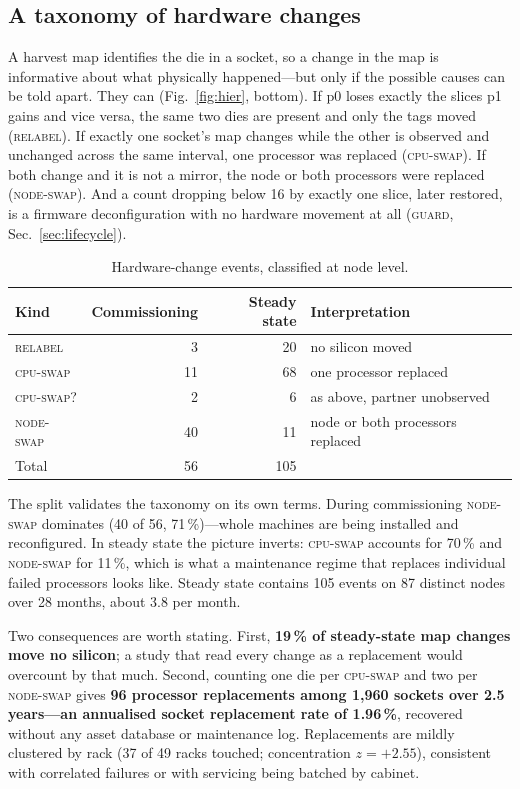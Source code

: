 \documentclass[10pt,conference]{IEEEtran}
\begin{document}
\subsection{A taxonomy of hardware changes}
\label{sec:taxonomy}
A harvest map identifies the die in a socket, so a change in the map is informative about what
physically happened---but only if the possible causes can be told apart. They can
(Fig.~\ref{fig:hier}, bottom). If p0 loses exactly the slices p1 gains and vice versa, the same two
dies are present and only the tags moved (\textsc{relabel}). If exactly one socket's map changes
while the other is observed and unchanged across the same interval, one processor was replaced
(\textsc{cpu-swap}). If both change and it is not a mirror, the node or both processors were
replaced (\textsc{node-swap}). And a count dropping below 16 by exactly one slice, later restored,
is a firmware deconfiguration with no hardware movement at all (\textsc{guard},
Sec.~\ref{sec:lifecycle}).

\begin{table}[h]\centering\caption{Hardware-change events, classified at node level.}
\label{tab:taxonomy}
\begin{tabular}{lrrl}\toprule
Kind & Commissioning & Steady state & Interpretation\\\midrule
\textsc{relabel}   &  3 &  20 & no silicon moved\\
\textsc{cpu-swap}  & 11 &  68 & one processor replaced\\
\textsc{cpu-swap?} &  2 &   6 & as above, partner unobserved\\
\textsc{node-swap} & 40 &  11 & node or both processors replaced\\\midrule
Total              & 56 & 105 & \\
\bottomrule\end{tabular}\end{table}

The split validates the taxonomy on its own terms. During commissioning \textsc{node-swap}
dominates (40 of 56, 71\,\%)---whole machines are being installed and reconfigured. In steady state
the picture inverts: \textsc{cpu-swap} accounts for 70\,\% and \textsc{node-swap} for 11\,\%,
which is what a maintenance regime that replaces individual failed processors looks like. Steady
state contains 105 events on 87 distinct nodes over 28 months, about 3.8 per month.

Two consequences are worth stating. First, \textbf{19\,\% of steady-state map changes move no
silicon}; a study that read every change as a replacement would overcount by that much. Second,
counting one die per \textsc{cpu-swap} and two per \textsc{node-swap} gives \textbf{96 processor
replacements among 1{,}960 sockets over 2.5 years---an annualised socket replacement rate of
1.96\,\%}, recovered without any asset database or maintenance log. Replacements are mildly
clustered by rack (37 of 49 racks touched; concentration $z=+2.55$), consistent with correlated
failures or with servicing being batched by cabinet.
\end{document}
